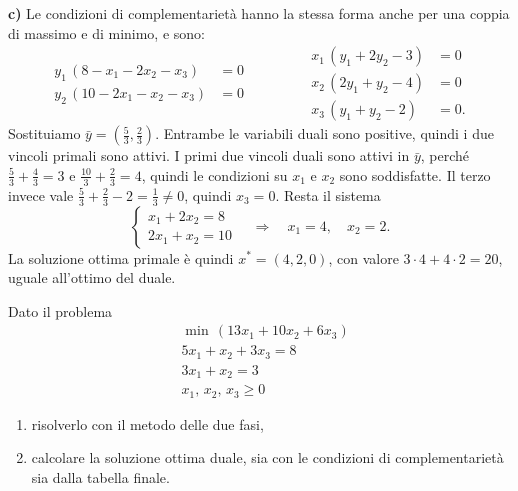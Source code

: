 \textbf{c)} Le condizioni di complementarietà hanno la stessa forma anche per una coppia di massimo e di minimo, e sono:
\[
\begin{aligned}
y_1\,(8 - x_1 - 2x_2 - x_3) &= 0 \\
y_2\,(10 - 2x_1 - x_2 - x_3) &= 0
\end{aligned}
\qquad\qquad
\begin{aligned}
x_1\,(y_1 + 2y_2 - 3) &= 0 \\
x_2\,(2y_1 + y_2 - 4) &= 0 \\
x_3\,(y_1 + y_2 - 2) &= 0.
\end{aligned}
\]
Sostituiamo $\bar{y} = (\frac53, \frac23)$. Entrambe le variabili duali sono positive, quindi i due vincoli primali sono attivi. I primi due vincoli duali sono attivi in $\bar{y}$, perché $\frac53 + \frac43 = 3$ e $\frac{10}{3} + \frac23 = 4$, quindi le condizioni su $x_1$ e $x_2$ sono soddisfatte. Il terzo invece vale $\frac53 + \frac23 - 2 = \frac13 \neq 0$, quindi $x_3 = 0$. Resta il sistema
\[
\begin{cases}
x_1 + 2x_2 = 8 \\
2x_1 + x_2 = 10
\end{cases}
\quad\Longrightarrow\quad x_1 = 4, \quad x_2 = 2.
\]
La soluzione ottima primale è quindi $x^* = (4, 2, 0)$, con valore $3 \cdot 4 + 4 \cdot 2 = 20$, uguale all'ottimo del duale.

\begin{esercizio}
Dato il problema
\[
\begin{aligned}
&\min\, (13x_1 + 10x_2 + 6x_3) \\
&5x_1 + x_2 + 3x_3 = 8 \\
&3x_1 + x_2 = 3 \\
&x_1,\, x_2,\, x_3 \ge 0
\end{aligned}
\]
\begin{enumerate}[label=\alph*)]
    \item risolverlo con il metodo delle due fasi,
    \item calcolare la soluzione ottima duale, sia con le condizioni di complementarietà sia dalla tabella finale.
\end{enumerate}
\end{esercizio}


